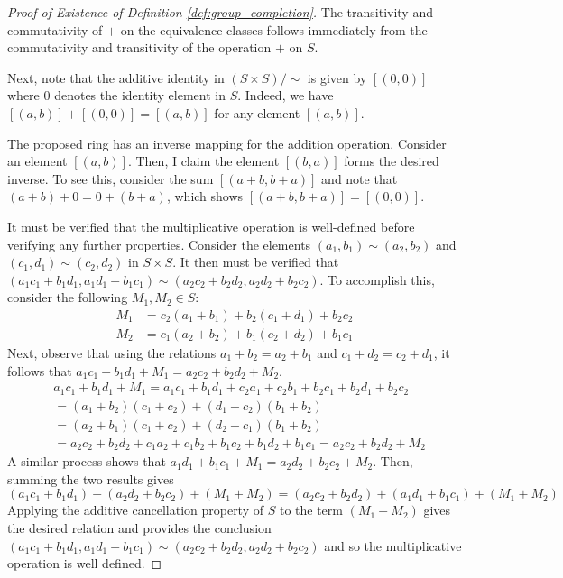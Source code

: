 \documentclass[../../sean_thesis.tex]{subfiles}
\begin{document}
\begin{proof}[Proof of Existence of Definition \ref{def:group_completion}]
The transitivity and commutativity of $+$ on the equivalence classes follows immediately from the commutativity and transitivity of the operation $+$ on $S$.
	
	
Next, note that the additive identity in $(S\times S)/\sim$ is given by $[(0,0)]$ where $0$ denotes the identity element in $S$. Indeed, we have $[(a,b)] + [(0,0)] = [(a,b)]$ for any element $[(a,b)]$.
	
	
The proposed ring has an inverse mapping for the addition operation. Consider an element $[(a,b)]$. Then, I claim the element $[(b,a)]$ forms the desired inverse. To see this, consider the sum $[(a + b, b + a)]$ and note that $(a + b) + 0 = 0 + (b + a)$, which shows $[(a + b, b + a)] = [(0,0)]$.


It must be verified that the multiplicative operation is well-defined before verifying any further properties. Consider the elements $(a_1,b_1) \sim (a_2,b_2)$ and $(c_1,d_1) \sim (c_2,d_2)$ in $S \times S$. It then must be verified that $(a_1c_1+b_1d_1, a_1d_1+b_1c_1)\sim(a_2c_2+b_2d_2, a_2d_2+b_2c_2)$. To accomplish this, consider the following $M_1, M_2 \in S$:
\begin{align*}
	M_1 &= c_2(a_1+b_1) + b_2(c_1+d_1) + b_2c_2\\
	M_2 &= c_1(a_2+b_2) + b_1(c_2+d_2) + b_1c_1
\end{align*}
Next, observe that using the relations $a_1+b_2=a_2+b_1$ and $c_1+d_2=c_2+d_1$, it follows that $a_1c_1+b_1d_1 + M_1 = a_2c_2+b_2d_2 + M_2$.
\begin{align*}
	&a_1c_1+b_1d_1 + M_1
	= a_1c_1+b_1d_1 + c_2a_1+c_2b_1+b_2c_1+b_2d_1+b_2c_2\\
	&= (a_1+b_2)(c_1+c_2) + (d_1+c_2)(b_1+b_2)\\
	&= (a_2+b_1)(c_1+c_2) + (d_2+c_1)(b_1+b_2)\\
	&= a_2c_2+b_2d_2 + c_1a_2+c_1b_2+b_1c_2+b_1d_2+b_1c_1
	= a_2c_2+b_2d_2 + M_2
\end{align*}
A similar process shows that $a_1d_1+b_1c_1 + M_1 = a_2d_2+b_2c_2 + M_2$. Then, summing the two results gives
\begin{equation*}
 (a_1c_1+b_1d_1) + (a_2d_2+b_2c_2) + (M_1 + M_2)
=(a_2c_2+b_2d_2) + (a_1d_1+b_1c_1) + (M_1 + M_2)
\end{equation*}
Applying the additive cancellation property of $S$ to the term $(M_1+M_2)$ gives the desired relation and provides the conclusion $(a_1c_1+b_1d_1, a_1d_1+b_1c_1)\sim(a_2c_2+b_2d_2, a_2d_2+b_2c_2)$ and so the multiplicative operation is well defined.


\end{proof}
\end{document}
